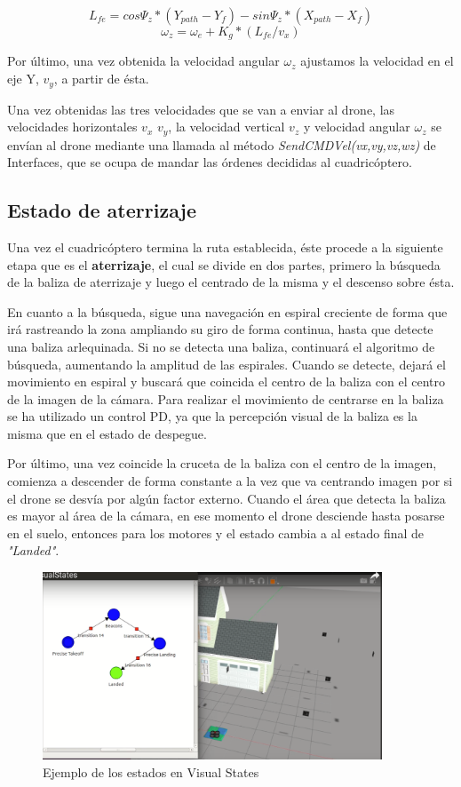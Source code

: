 \[ L_{fe} = cos\Psi_{z}*(Y_{path}-Y_{f}) - sin\Psi_{z}*(X_{path}-X_{f}) \]
\[ \omega_{z} = \omega_{e} + K_{g} * (L_{fe}/v_{x})\]

\hspace{1cm} Por último, una vez obtenida la velocidad angular $\omega_{z}$ ajustamos la velocidad en el eje Y, $v_{y}$, a partir de ésta.

\hspace{1cm} Una vez obtenidas las tres velocidades que se van a enviar al drone, las velocidades horizontales $v_{x}$ $v_{y}$, la velocidad vertical $v_{z}$ y velocidad angular $\omega_{z}$ se envían al drone mediante una llamada al método \textit{SendCMDVel(vx,vy,vz,wz)} de Interfaces, que se ocupa de mandar las órdenes decididas al cuadricóptero.

\subsection{Estado de aterrizaje}
\hspace{1cm} Una vez el cuadricóptero termina la ruta establecida, éste procede a la siguiente etapa que es el \textbf{aterrizaje}, el cual se divide en dos partes, primero la búsqueda de la baliza de aterrizaje y luego el centrado de la misma y el descenso sobre ésta. 

\hspace{1cm} En cuanto a la búsqueda, sigue una navegación en espiral creciente de forma que irá rastreando la zona ampliando su giro de forma continua, hasta que detecte una baliza arlequinada. Si no se detecta una baliza, continuará el algoritmo de búsqueda, aumentando la amplitud de las espirales. Cuando se detecte, dejará el movimiento en espiral y buscará que coincida el centro de la baliza con el centro de la imagen de la cámara.  Para realizar el movimiento de centrarse en la baliza se ha utilizado un control PD, ya que la percepción visual de la baliza es la misma que en el estado de despegue.  

\hspace{1cm} Por último, una vez coincide la cruceta de la baliza con el centro de la imagen, comienza a descender de forma constante a la vez que va centrando imagen por si el drone se desvía por algún factor externo. Cuando el área que detecta la baliza es mayor al área de la cámara, en ese momento el drone desciende hasta  posarse en el suelo, entonces para los motores y el estado cambia a al estado final de \textit{"Landed"}.

\begin{figure}[H]
	\begin{center}
		\includegraphics[width=0.9\textwidth]{imag/IMG34.png}
				\caption{Ejemplo de los estados en Visual States}
		\label{fig:Ejemplo Visual States.}	
	\end{center}
\end{figure}